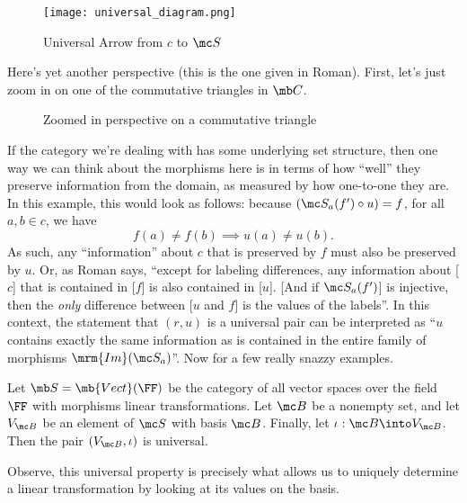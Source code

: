 \documentclass{fkbook}
\theoremstyle{snazzydefinition}
\renewenvironment{example}
  {\pushQED{\oldqed}\renewcommand{\qedsymbol}{$\triangle$}\examplex}
  {\popQED\endexamplex}
\begin{document}
  \begin{figure}[h]
    \centering
    \texttt{[image: universal\_diagram.png]}
    \caption{Universal Arrow from $c$ to $\mc S$}
    \label{fig:universal}
  \end{figure}
  Here's yet another perspective (this is the one given in Roman).
  First, let's just zoom in on one of the commutative triangles in
  $\mb C$.
  \begin{figure}[H]
    \centering
    \caption{Zoomed in perspective on a commutative triangle}
    \label{fig:universaltriangle}
  \end{figure}
  If the category we're dealing with has some underlying set
  structure, then one way we can think about the morphisms here is in
  terms of how ``well'' they preserve information from the domain, as
  measured by how one-to-one they are. In this example, this would
  look as follows: because $(\mc S_a(f') \circ u) = f$, for all $a,b
  \in c$, we have
  \[
    f(a) \neq f(b) \implies u(a) \neq u(b).
  \]
  As such, any ``information'' about $c$ that is preserved by $f$ must
  also be preserved by $u$. Or, as Roman says, ``except for labeling
  differences, any information about [$c$] that is contained in [$f$]
  is also contained in [$u$]. [And if $\mc S_a(f')$] is injective,
  then the \emph{only} difference between [$u$ and $f$] is the values
  of the labels''. In this context, the statement that $(r,u)$ is a
  universal pair can be interpreted as ``$u$ contains exactly the same
  information as is contained in the entire family of morphisms
  $\mrm{Im}(\mc S_a)$''. Now for a few really snazzy examples.
  \begin{leftbar}\vspace{-1em}
    \begin{example}[Bases]
      Let $\mb S = \mb{Vect}(\FF)$ be the category of all vector spaces
      over the field $\FF$ with morphisms linear transformations. Let
      $\mc B$ be a nonempty set, and let $V_{\mc B}$ be an element of
      $\mc S$ with basis $\mc B$. Finally, let $\iota : \mc B \into
      V_{\mc B}$. Then the pair $(V_{\mc B}, \iota)$ is universal.

      Observe, this universal property is precisely what allows us to
      uniquely determine a linear transformation by looking at its
      values on the basis.
    \end{example}
  \end{leftbar}
\end{document}
